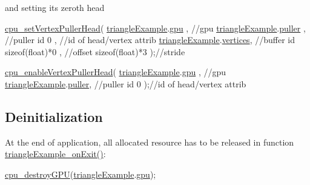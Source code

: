 and setting its zeroth head 
\begin{DoxyCodeInclude}
  \hyperlink{vertexPuller_8h_a07be46ae38b8ec80ec85581a33b02786}{cpu\_setVertexPullerHead}(
      \hyperlink{triangleExample_8c_af82b723635ac0c90962571915a1b1163}{triangleExample}.\hyperlink{structTriangleExampleVariables_a6c5c3f82065ae9aac07f9e6f11dd03b3}{gpu}     , \textcolor{comment}{//gpu}
      \hyperlink{triangleExample_8c_af82b723635ac0c90962571915a1b1163}{triangleExample}.\hyperlink{structTriangleExampleVariables_a82e39dd0d18fc57422686229d801e39f}{puller}  , \textcolor{comment}{//puller id}
      0                       , \textcolor{comment}{//id of head/vertex attrib}
      \hyperlink{triangleExample_8c_af82b723635ac0c90962571915a1b1163}{triangleExample}.\hyperlink{structTriangleExampleVariables_acb7968b625f2e01866994769209cf32e}{vertices}, \textcolor{comment}{//buffer id}
      \textcolor{keyword}{sizeof}(\textcolor{keywordtype}{float})*0         , \textcolor{comment}{//offset}
      \textcolor{keyword}{sizeof}(\textcolor{keywordtype}{float})*3         );\textcolor{comment}{//stride}

  \hyperlink{vertexPuller_8h_afc4c70416bc0e515e75ec90c8c8d1584}{cpu\_enableVertexPullerHead}(
      \hyperlink{triangleExample_8c_af82b723635ac0c90962571915a1b1163}{triangleExample}.\hyperlink{structTriangleExampleVariables_a6c5c3f82065ae9aac07f9e6f11dd03b3}{gpu}   , \textcolor{comment}{//gpu}
      \hyperlink{triangleExample_8c_af82b723635ac0c90962571915a1b1163}{triangleExample}.\hyperlink{structTriangleExampleVariables_a82e39dd0d18fc57422686229d801e39f}{puller}, \textcolor{comment}{//puller id}
      0                     );\textcolor{comment}{//id of head/vertex attrib}
\end{DoxyCodeInclude}
\hypertarget{triangleExample.c_Deinitialization}{}\subsection{Deinitialization}\label{triangleExample.c_Deinitialization}
At the end of application, all allocated resource has to be released in function \hyperlink{triangleExample_8c_a35b10f59fe16423447777ba6bbba3b66}{triangle\+Example\+\_\+on\+Exit()}\+: 
\begin{DoxyCodeInclude}
  \hyperlink{gpu_8h_aefa64b1f8ea2c83b8c80c68089739dc1}{cpu\_destroyGPU}(\hyperlink{triangleExample_8c_af82b723635ac0c90962571915a1b1163}{triangleExample}.\hyperlink{structTriangleExampleVariables_a6c5c3f82065ae9aac07f9e6f11dd03b3}{gpu});
\end{DoxyCodeInclude}
